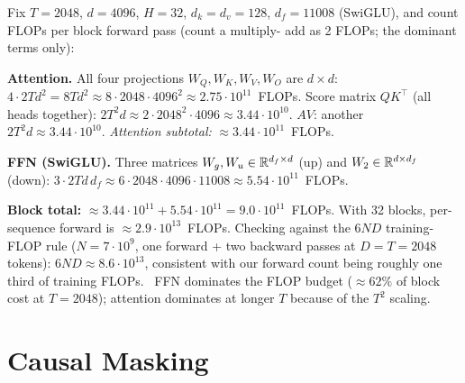 \begin{workedexample}
Fix $T=2048$, $d=4096$, $H=32$, $d_k=d_v=128$, $d_f = 11008$
(SwiGLU), and count FLOPs per block forward pass (count a multiply-
add as 2 FLOPs; the dominant terms only):

\textbf{Attention.} All four projections $W_Q,W_K,W_V,W_O$ are
$d \times d$: $4 \cdot 2 T d^2 = 8 T d^2 \approx 8 \cdot 2048 \cdot
4096^2 \approx 2.75 \cdot 10^{11}$~FLOPs.
Score matrix $Q K^{\top}$ (all heads together): $2 T^2 d
\approx 2 \cdot 2048^2 \cdot 4096 \approx 3.44 \cdot 10^{10}$.
$A V$: another $2 T^2 d \approx 3.44 \cdot 10^{10}$.
\emph{Attention subtotal:} $\approx 3.44 \cdot 10^{11}$~FLOPs.

\textbf{FFN (SwiGLU).} Three matrices $W_g, W_u \in \mathbb{R}^{d_f\times d}$
(up) and $W_2 \in \mathbb{R}^{d\times d_f}$ (down):
$3 \cdot 2 T d\, d_f \approx 6 \cdot 2048 \cdot 4096 \cdot 11008
\approx 5.54 \cdot 10^{11}$~FLOPs.

\textbf{Block total:} $\approx 3.44 \cdot 10^{11} + 5.54 \cdot
10^{11} = 9.0 \cdot 10^{11}$~FLOPs. With 32 blocks, per-sequence
forward is $\approx 2.9 \cdot 10^{13}$~FLOPs. Checking against the
$6ND$ training-FLOP rule ($N = 7 \cdot 10^9$, one forward + two
backward passes at $D = T = 2048$ tokens): $6ND \approx 8.6 \cdot
10^{13}$, consistent with our forward count being roughly one third
of training FLOPs. \Ident\ FFN dominates the FLOP budget
($\approx 62\%$ of block cost at $T=2048$); attention dominates at
longer $T$ because of the $T^2$ scaling.
\end{workedexample}

\section{Causal Masking}

